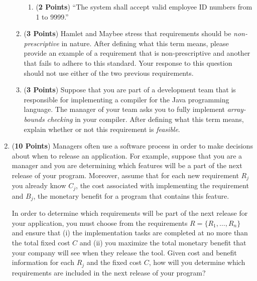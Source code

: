 \documentclass[12pt,epsf,psfig,graphics]{article}
\begin{document}
\begin{enumerate}
\begin{enumerate}
\begin{enumerate}
            \item ({\bf 2 Points}) ``The system shall accept valid
              employee ID numbers from 1 to 9999.''

          \end{enumerate}                    
          
        \item ({\bf 3 Points}) Hamlet and Maybee stress that
          requirements should be {\em non-prescriptive} in nature.
          After defining what this term means, please provide an
          example of a requirement that is non-prescriptive and
          another that fails to adhere to this standard.  Your
          response to this question should not use either of the two
          previous requirements.

        \item ({\bf 3 Points}) Suppose that you are part of a
          development team that is responsible for implementing a
          compiler for the Java programming language.  The manager of
          your team asks you to fully implement {\em array-bounds
            checking} in your compiler.  After defining what this term
          means, explain whether or not this requirement is {\em
            feasible}.

        \end{enumerate}

\newpage

\item ({\bf 10 Points}) Managers often use a software process in order
  to make decisions about when to release an application.  For
  example, suppose that you are a manager and you are determining
  which features will be a part of the next release of your program.
  Moreover, assume that for each new requirement $R_j$ you already
  know $C_j$, the cost associated with implementing the requirement
  and $B_j$, the monetary benefit for a program that contains this
  feature.

  In order to determine which requirements will be part of the next
  release for your application, you must choose from the requirements
  $R = \{ R_1, \ldots, R_n \}$ and ensure that (i) the implementation
  tasks are completed at no more than the total fixed cost $C$ and
  (ii) you maximize the total monetary benefit that your company will
  see when they release the tool.  Given cost and benefit information
  for each $R_j$ and the fixed cost $C$, how will you determine which
  requirements are included in the next release of your program?
    

\end{enumerate}
\end{document}
